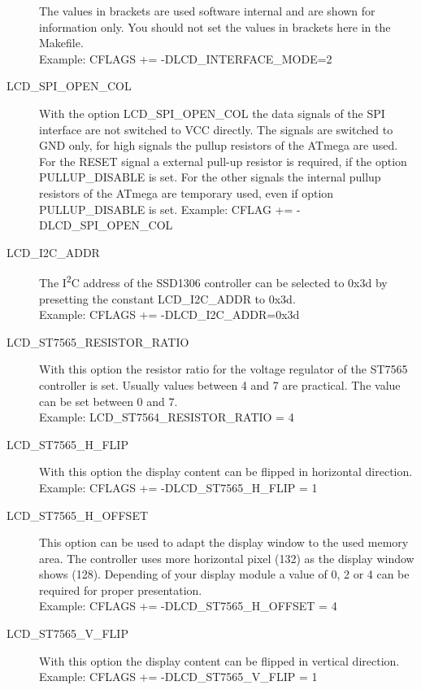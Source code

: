 \begin{description}
The values in brackets are used software internal and are shown for information only.
You should not set the values in brackets here in the Makefile.\\

Example: CFLAGS += -DLCD\_INTERFACE\_MODE=2

  \item[LCD\_SPI\_OPEN\_COL] With the option LCD\_SPI\_OPEN\_COL the data signals of the SPI interface
are not switched to VCC directly.
The signals are switched to GND only, for high signals the pullup resistors of the ATmega are used.
For the RESET signal a external pull-up resistor is required, if the option PULLUP\_DISABLE is set.
For the other signals the internal pullup resistors of the ATmega are temporary used,
even if option PULLUP\_DISABLE is set.
Example: CFLAG += -DLCD\_SPI\_OPEN\_COL

\item[LCD\_I2C\_ADDR] The I\textsuperscript{2}C address of the SSD1306 controller can be selected to 0x3d by presetting
the constant LCD\_I2C\_ADDR to 0x3d.\\
Example: CFLAGS += -DLCD\_I2C\_ADDR=0x3d

  \item[LCD\_ST7565\_RESISTOR\_RATIO] With this option the resistor ratio for the voltage regulator of
the ST7565 controller is set.
Usually values between 4 and 7 are practical.
The value can be set between 0 and 7.\\
Example: LCD\_ST7564\_RESISTOR\_RATIO = 4

  \item[LCD\_ST7565\_H\_FLIP] With this option the display content can be flipped in horizontal direction.\\
Example: CFLAGS += -DLCD\_ST7565\_H\_FLIP = 1

  \item[LCD\_ST7565\_H\_OFFSET] This option can be used to adapt the display window to the used memory area.
 The controller uses more horizontal pixel (132) as the display window shows (128).
 Depending of your display module a value of 0, 2 or 4 can be required for proper presentation.\\
Example: CFLAGS += -DLCD\_ST7565\_H\_OFFSET = 4

  \item[LCD\_ST7565\_V\_FLIP] With this option the display content can be flipped in vertical direction.\\
Example: CFLAGS += -DLCD\_ST7565\_V\_FLIP = 1


\end{description}
